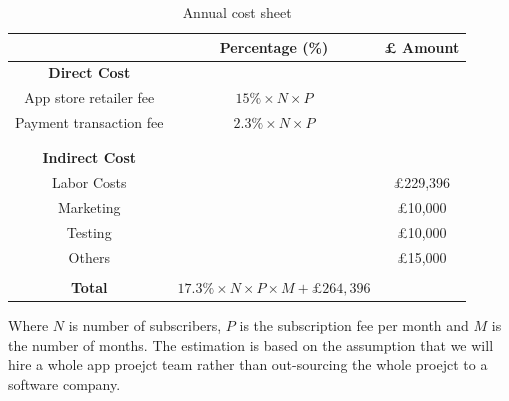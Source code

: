 \begin{table}[ht]
\centering
\begin{tabular}{ |c|c|c|} 
 \hline
 &\textbf{Percentage (\%)} &\textbf{ £ Amount }\\
 \hline
\multicolumn{1}{|c}{\textbf{Direct Cost}} &\multicolumn{1}{c}{}&\\
 \hline
 App store retailer fee&$15\%\times N \times P$&\\
 \hline
 Payment transaction fee&$2.3\% \times N \times P$&\\
 \hline
 &&\\
 \hline
 \multicolumn{1}{|c}{}&\multicolumn{1}{c}{}&\\\hline
 \multicolumn{1}{|c}{\textbf{Indirect Cost}} &\multicolumn{1}{c}{}&\\
 \hline
 Labor Costs&&£229,396\\
 \hline
 Marketing&&£10,000\\
 \hline
 Testing&&£10,000\\
 \hline
 Others&&£15,000\\
 \hline
 \multicolumn{1}{|c}{}&\multicolumn{1}{c}{}&\\
 \hline
 \textbf{Total}&\multicolumn{1}{c}{$17.3\%\times N \times P \times M + \pounds 264,396$}&\\
 \hline
 \end{tabular}
 \caption{Annual cost sheet}
 \label{costsheet}
 \end{table}
Where $N$ is number of subscribers, $P$ is the subscription fee per month and $M$ is the number of months. The estimation is based on the assumption that we will hire a whole app proejct team rather than out-sourcing the whole proejct to a software company.


